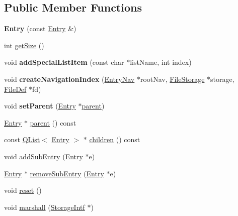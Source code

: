 \subsection*{Public Member Functions}
\begin{DoxyCompactItemize}
\item 
\mbox{\label{class_entry_a98c62e07d86951008cc8a0d60632c262}} 
{\bfseries Entry} (const \mbox{\hyperlink{class_entry}{Entry}} \&)
\item 
int \mbox{\hyperlink{class_entry_af8a7c9072149622cf62be17fc0bc9ec9}{get\+Size}} ()
\item 
\mbox{\label{class_entry_aef1da1fbcf9b0f564b47fb7ddd201a1e}} 
void {\bfseries add\+Special\+List\+Item} (const char $\ast$list\+Name, int index)
\item 
\mbox{\label{class_entry_a3f62f91546f105d6552fd8a89513bfaf}} 
void {\bfseries create\+Navigation\+Index} (\mbox{\hyperlink{class_entry_nav}{Entry\+Nav}} $\ast$root\+Nav, \mbox{\hyperlink{class_file_storage}{File\+Storage}} $\ast$storage, \mbox{\hyperlink{class_file_def}{File\+Def}} $\ast$fd)
\item 
\mbox{\label{class_entry_a21bfe6584b202258d72fd158aac694c4}} 
void {\bfseries set\+Parent} (\mbox{\hyperlink{class_entry}{Entry}} $\ast$\mbox{\hyperlink{class_entry_ad3ab0ffc3607082ee955b6eeca68dc89}{parent}})
\item 
\mbox{\hyperlink{class_entry}{Entry}} $\ast$ \mbox{\hyperlink{class_entry_ad3ab0ffc3607082ee955b6eeca68dc89}{parent}} () const
\item 
const \mbox{\hyperlink{class_q_list}{Q\+List}}$<$ \mbox{\hyperlink{class_entry}{Entry}} $>$ $\ast$ \mbox{\hyperlink{class_entry_a1ede1a1bcb62ce21781fe86e8d3c5ddc}{children}} () const
\item 
void \mbox{\hyperlink{class_entry_a8c8479030e7a983413308cd412a926ff}{add\+Sub\+Entry}} (\mbox{\hyperlink{class_entry}{Entry}} $\ast$e)
\item 
\mbox{\hyperlink{class_entry}{Entry}} $\ast$ \mbox{\hyperlink{class_entry_aecaae1b0c184b1ee2dc342ce7d6300f1}{remove\+Sub\+Entry}} (\mbox{\hyperlink{class_entry}{Entry}} $\ast$e)
\item 
void \mbox{\hyperlink{class_entry_ae9367c39f34b043c6e36ddb52a4188e0}{reset}} ()
\item 
void \mbox{\hyperlink{class_entry_a902c34351fc9978dfe5530804827ceb6}{marshall}} (\mbox{\hyperlink{class_storage_intf}{Storage\+Intf}} $\ast$)

\end{DoxyCompactItemize}
